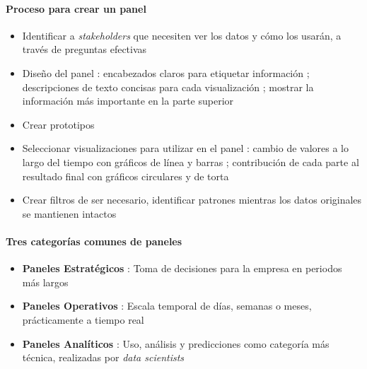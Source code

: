 \paragraph{Proceso para crear un panel}
    \begin{itemize}
        \item {Identificar a \textit{stakeholders} que necesiten ver los datos y cómo los usarán, a través de preguntas efectivas}
        \item {Diseño del panel : encabezados claros para etiquetar información ; descripciones de texto concisas para cada visualización ; mostrar la información más importante en la parte superior}
        \item {Crear prototipos}
        \item {Seleccionar visualizaciones para utilizar en el panel : cambio de valores a lo largo del tiempo con gráficos de línea y barras ; contribución de cada parte al resultado final con gráficos circulares y de torta}
        \item {Crear filtros de ser necesario, identificar patrones mientras los datos originales se mantienen intactos}
    \end{itemize}
\paragraph{Tres categorías comunes de paneles}
    \begin{itemize}
        \item {\textbf{Paneles Estratégicos} : Toma de decisiones para la empresa en periodos más largos}
        \item {\textbf{Paneles Operativos} : Escala temporal de días, semanas o meses, prácticamente a tiempo real}
        \item {\textbf{Paneles Analíticos} : Uso, análisis y predicciones como categoría más técnica, realizadas por \textit{data scientists}}
    \end{itemize}

